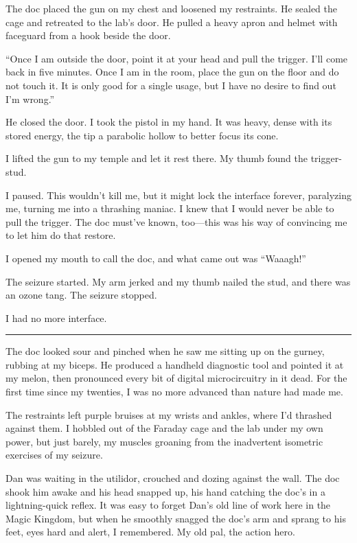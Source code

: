 The doc placed the gun on my chest and loosened my restraints. He
sealed the cage and retreated to the lab's door. He pulled a heavy
apron and helmet with faceguard from a hook beside the door.

“Once I am outside the door, point it at your head and pull the
trigger. I'll come back in five minutes. Once I am in the room,
place the gun on the floor and do not touch it. It is only good for
a single usage, but I have no desire to find out I'm wrong.”

He closed the door. I took the pistol in my hand. It was heavy,
dense with its stored energy, the tip a parabolic hollow to better
focus its cone.

I lifted the gun to my temple and let it rest there. My thumb found
the trigger-stud.

I paused. This wouldn't kill me, but it might lock the interface
forever, paralyzing me, turning me into a thrashing maniac. I knew
that I would never be able to pull the trigger. The doc must've
known, too—this was his way of convincing me to let him do that
restore.

I opened my mouth to call the doc, and what came out was “Waaagh!”

The seizure started. My arm jerked and my thumb nailed the stud,
and there was an ozone tang. The seizure stopped.

I had no more interface.

\begin{center}\rule{3in}{0.4pt}\end{center}

The doc looked sour and pinched when he saw me sitting up on the
gurney, rubbing at my biceps. He produced a handheld diagnostic
tool and pointed it at my melon, then pronounced every bit of
digital microcircuitry in it dead. For the first time since my
twenties, I was no more advanced than nature had made me.

The restraints left purple bruises at my wrists and ankles, where
I'd thrashed against them. I hobbled out of the Faraday cage and
the lab under my own power, but just barely, my muscles groaning
from the inadvertent isometric exercises of my seizure.

Dan was waiting in the utilidor, crouched and dozing against the
wall. The doc shook him awake and his head snapped up, his hand
catching the doc's in a lightning-quick reflex. It was easy to
forget Dan's old line of work here in the Magic Kingdom, but when
he smoothly snagged the doc's arm and sprang to his feet, eyes hard
and alert, I remembered. My old pal, the action hero.

